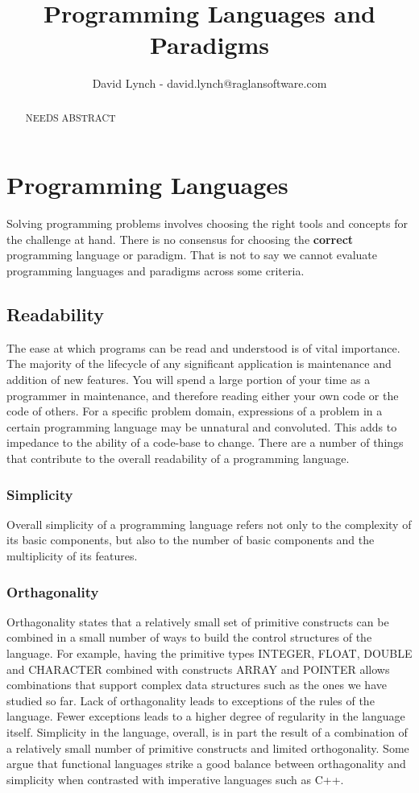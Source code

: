 \documentclass[10pt,a4paper]{article}
\title{Programming Languages and Paradigms}
\author{David Lynch - david.lynch@raglansoftware.com }
\begin{document}
\maketitle
\begin{abstract}
NEEDS ABSTRACT
\end{abstract}
\section{Programming Languages}
Solving programming problems involves choosing the right tools and concepts for the challenge at hand. There is no consensus for choosing the {\bf correct} programming language or paradigm. That is not to say we cannot evaluate programming languages and paradigms across some criteria. 
\subsection{Readability}
The ease at which programs can be read and understood is of vital importance. The majority of the lifecycle of any significant application is maintenance and addition of new features. You will spend a large portion of your time as a programmer in maintenance, and therefore reading either your own code or the code of others. For a specific problem domain, expressions of a problem in a certain programming language may be unnatural and convoluted. This adds to impedance to the ability of a code-base to change. There are a number of things that contribute to the overall readability of a programming language. 
\subsubsection{Simplicity}
Overall simplicity of a programming language refers not only to the complexity of its basic components, but also to the number of basic components and the multiplicity of its features. 
\subsubsection{Orthagonality}
Orthagonality states that a relatively small set of primitive constructs can be combined in a small number of ways to build the control structures of the language. For example, having the primitive types INTEGER, FLOAT, DOUBLE and CHARACTER combined with constructs ARRAY and POINTER allows combinations that support complex data structures such as the ones we have studied so far. Lack of orthagonality leads to exceptions of the rules of the language. Fewer exceptions leads to a higher degree of regularity in the language itself. Simplicity in the language, overall, is in part the result of a combination of a relatively small number of primitive constructs and limited orthogonality. Some argue that functional languages strike a good balance between orthagonality and simplicity when contrasted with imperative languages such as C++.
\end{document}
